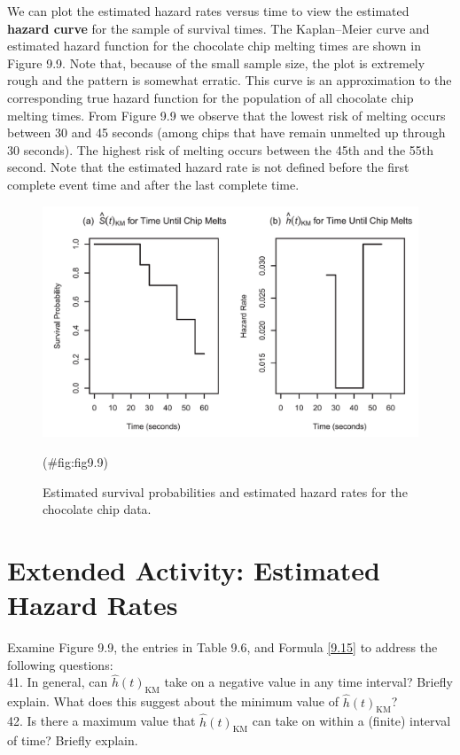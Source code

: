 \documentclass[
]{report}
\begin{document}
We can plot the estimated hazard rates versus time to view the estimated \textbf{hazard curve} for the sample of survival times. The Kaplan--Meier curve and estimated hazard function for the chocolate chip melting times are shown in Figure 9.9. Note that, because of the small sample size, the plot is extremely rough and the pattern is somewhat erratic. This curve is an approximation to the corresponding true hazard function for the population of all chocolate chip melting times. From Figure 9.9 we observe that the lowest risk of melting occurs between 30 and 45 seconds (among chips that have remain unmelted up through 30 seconds). The highest risk of melting occurs between the 45th and the 55th second. Note that the estimated hazard rate is not defined before the first complete event time and after the last complete time.

\begin{figure}

{\centering \includegraphics[width=1\linewidth]{docs/Fig9_9} 

}

\caption{Estimated survival probabilities and estimated hazard rates for the chocolate chip data.}(\#fig:fig9.9)
\end{figure}

\section*{Extended Activity: Estimated Hazard Rates}\label{extended-activity-estimated-hazard-rates}

Examine Figure 9.9, the entries in Table 9.6, and Formula \ref{9.15} to address the following questions:\\
41. In general, can \(\hat h(t)_{\mathrm{KM}}\) take on a negative value in any time interval? Briefly explain. What does this suggest about the minimum value of \(\hat h(t)_{\mathrm{KM}}\)?\\
42. Is there a maximum value that \(\hat h(t)_{\mathrm{KM}}\) can take on within a (finite) interval of time? Briefly explain.
\end{document}
